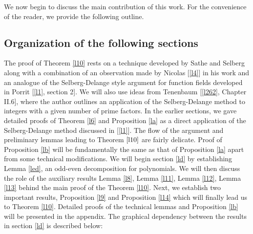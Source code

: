 \documentclass[12pt]{amsart}
\numberwithin{equation}{section}
\theoremstyle{remark}
\theoremstyle{remark}
\theoremstyle{definition}
\begin{document}
We now begin to discuss the main contribution of this work. For the convenience of the reader, we provide the following outline.
\subsection{Organization of the following sections} The proof of Theorem \ref{l10} rests on a technique developed by Sathe and Selberg along with a combination of an observation made by Nicolas [\ref{l4}] in his work and an analogue of the Selberg-Delange style argument for function fields developed in Porrit [\ref{l1}, section 2]. We will also use ideas from Tenenbaum [\ref{l262}, Chapter II.6], where the author outlines an application of the Selberg-Delange method to integers with a given number of prime factors. In the earlier sections, we gave detailed proofs of Theorem \ref{l6} and Proposition \ref{la} as a direct application of the Selberg-Delange method discussed in [\ref{l1}]. The flow of the argument and preliminary lemmas leading to Theorem $\ref{l10}$ are fairly delicate. Proof of Proposition \ref{lb} will be fundamentally the same as that of Proposition \ref{la} apart from some technical modifications. We will begin section \ref{ld} by establishing Lemma \ref{led}, an odd-even decomposition for polynomials. We will then discuss the role of the auxiliary results Lemma \ref{l8}, Lemma \ref{l11}, Lemma \ref{l12}, Lemma \ref{l13} behind the main proof of the Theorem \ref{l10}. Next, we establish two important results, Proposition \ref{l9} and Proposition \ref{l14} which will finally lead us to Theorem \ref{l10}. Detailed proofs of the technical lemmas and Proposition \ref{lb} will be presented in the appendix. The graphical dependency between the results in section \ref{ld} is described below:\\
\end{document}
